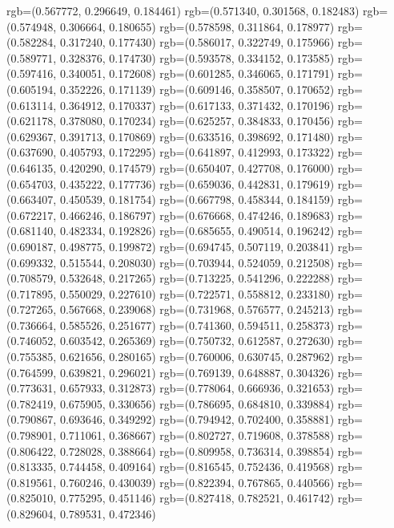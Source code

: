 {{{					rgb=(0.567772, 0.296649, 0.184461)
					rgb=(0.571340, 0.301568, 0.182483)
					rgb=(0.574948, 0.306664, 0.180655)
					rgb=(0.578598, 0.311864, 0.178977)
					rgb=(0.582284, 0.317240, 0.177430)
					rgb=(0.586017, 0.322749, 0.175966)
					rgb=(0.589771, 0.328376, 0.174730)
					rgb=(0.593578, 0.334152, 0.173585)
					rgb=(0.597416, 0.340051, 0.172608)
					rgb=(0.601285, 0.346065, 0.171791)
					rgb=(0.605194, 0.352226, 0.171139)
					rgb=(0.609146, 0.358507, 0.170652)
					rgb=(0.613114, 0.364912, 0.170337)
					rgb=(0.617133, 0.371432, 0.170196)
					rgb=(0.621178, 0.378080, 0.170234)
					rgb=(0.625257, 0.384833, 0.170456)
					rgb=(0.629367, 0.391713, 0.170869)
					rgb=(0.633516, 0.398692, 0.171480)
					rgb=(0.637690, 0.405793, 0.172295)
					rgb=(0.641897, 0.412993, 0.173322)
					rgb=(0.646135, 0.420290, 0.174579)
					rgb=(0.650407, 0.427708, 0.176000)
					rgb=(0.654703, 0.435222, 0.177736)
					rgb=(0.659036, 0.442831, 0.179619)
					rgb=(0.663407, 0.450539, 0.181754)
					rgb=(0.667798, 0.458344, 0.184159)
					rgb=(0.672217, 0.466246, 0.186797)
					rgb=(0.676668, 0.474246, 0.189683)
					rgb=(0.681140, 0.482334, 0.192826)
					rgb=(0.685655, 0.490514, 0.196242)
					rgb=(0.690187, 0.498775, 0.199872)
					rgb=(0.694745, 0.507119, 0.203841)
					rgb=(0.699332, 0.515544, 0.208030)
					rgb=(0.703944, 0.524059, 0.212508)
					rgb=(0.708579, 0.532648, 0.217265)
					rgb=(0.713225, 0.541296, 0.222288)
					rgb=(0.717895, 0.550029, 0.227610)
					rgb=(0.722571, 0.558812, 0.233180)
					rgb=(0.727265, 0.567668, 0.239068)
					rgb=(0.731968, 0.576577, 0.245213)
					rgb=(0.736664, 0.585526, 0.251677)
					rgb=(0.741360, 0.594511, 0.258373)
					rgb=(0.746052, 0.603542, 0.265369)
					rgb=(0.750732, 0.612587, 0.272630)
					rgb=(0.755385, 0.621656, 0.280165)
					rgb=(0.760006, 0.630745, 0.287962)
					rgb=(0.764599, 0.639821, 0.296021)
					rgb=(0.769139, 0.648887, 0.304326)
					rgb=(0.773631, 0.657933, 0.312873)
					rgb=(0.778064, 0.666936, 0.321653)
					rgb=(0.782419, 0.675905, 0.330656)
					rgb=(0.786695, 0.684810, 0.339884)
					rgb=(0.790867, 0.693646, 0.349292)
					rgb=(0.794942, 0.702400, 0.358881)
					rgb=(0.798901, 0.711061, 0.368667)
					rgb=(0.802727, 0.719608, 0.378588)
					rgb=(0.806422, 0.728028, 0.388664)
					rgb=(0.809958, 0.736314, 0.398854)
					rgb=(0.813335, 0.744458, 0.409164)
					rgb=(0.816545, 0.752436, 0.419568)
					rgb=(0.819561, 0.760246, 0.430039)
					rgb=(0.822394, 0.767865, 0.440566)
					rgb=(0.825010, 0.775295, 0.451146)
					rgb=(0.827418, 0.782521, 0.461742)
					rgb=(0.829604, 0.789531, 0.472346)
}}}
